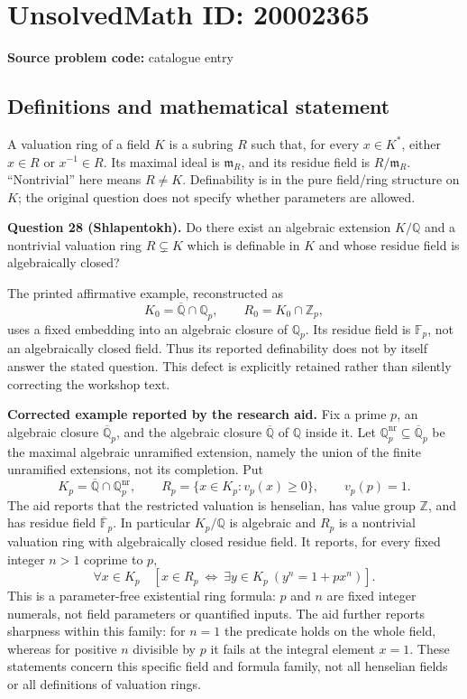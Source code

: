 \documentclass[11pt]{article}
\newcommand{\Z}{\mathbb{Z}}
\newcommand{\Q}{\mathbb{Q}}
\newcommand{\F}{\mathbb{F}}
\begin{document}
\section*{UnsolvedMath ID: 20002365}
\textbf{Source problem code:} catalogue entry
\subsection{Definitions and mathematical statement}
A valuation ring of a field \(K\) is a subring \(R\) such that, for every \(x\in K^*\), either \(x\in R\) or \(x^{-1}\in R\). Its maximal ideal is \(\mathfrak m_R\), and its residue field is \(R/\mathfrak m_R\). ``Nontrivial'' here means \(R\ne K\). Definability is in the pure field/ring structure on \(K\); the original question does not specify whether parameters are allowed.

\textbf{Question 28 (Shlapentokh).} Do there exist an algebraic extension \(K/\Q\) and a nontrivial valuation ring \(R\subsetneq K\) which is definable in \(K\) and whose residue field is algebraically closed?

The printed affirmative example, reconstructed as
\[
 K_0=\overline{\Q}\cap\Q_p,\qquad R_0=K_0\cap\Z_p,
\]
uses a fixed embedding into an algebraic closure of \(\Q_p\). Its residue field is \(\F_p\), not an algebraically closed field. Thus its reported definability does not by itself answer the stated question. This defect is explicitly retained rather than silently correcting the workshop text.

\textbf{Corrected example reported by the research aid.} Fix a prime \(p\), an algebraic closure \(\overline{\Q}_p\), and the algebraic closure \(\overline{\Q}\) of \(\Q\) inside it. Let \(\Q_p^{\mathrm{nr}}\subseteq\overline{\Q}_p\) be the maximal algebraic unramified extension, namely the union of the finite unramified extensions, not its completion. Put
\[
 K_p=\overline{\Q}\cap\Q_p^{\mathrm{nr}},\qquad
 R_p=\{x\in K_p:v_p(x)\geq0\},\qquad v_p(p)=1.
\]
The aid reports that the restricted valuation is henselian, has value group \(\Z\), and has residue field \(\overline{\F}_p\). In particular \(K_p/\Q\) is algebraic and \(R_p\) is a nontrivial valuation ring with algebraically closed residue field. It reports, for every fixed integer \(n>1\) coprime to \(p\),
\[
 \forall x\in K_p\quad
 \left[x\in R_p\ \Longleftrightarrow\
 \exists y\in K_p\ (y^n=1+p x^n)\right].
\]
This is a parameter-free existential ring formula: \(p\) and \(n\) are fixed integer numerals, not field parameters or quantified inputs. The aid further reports sharpness within this family: for \(n=1\) the predicate holds on the whole field, whereas for positive \(n\) divisible by \(p\) it fails at the integral element \(x=1\). These statements concern this specific field and formula family, not all henselian fields or all definitions of valuation rings.
\end{document}
